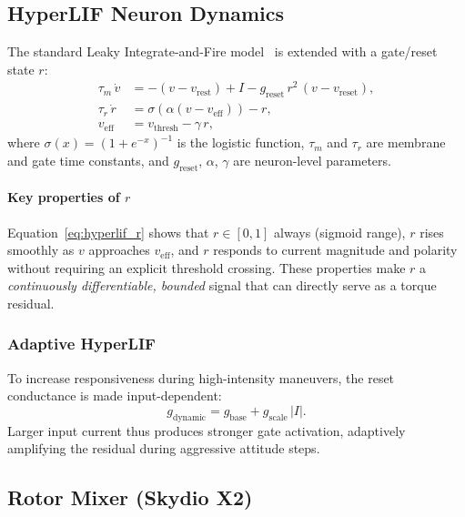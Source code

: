 \documentclass[conference]{IEEEtran}
\begin{document}
\subsection{HyperLIF Neuron Dynamics}
\label{sec:hyperlif_dynamics}

The standard Leaky Integrate-and-Fire model~\cite{maass1997lsm} is extended
with a gate/reset state $r$:
\begin{align}
  \tau_m\,\dot{v} &= -(v - v_{\mathrm{rest}}) + I
                     - g_{\mathrm{reset}}\,r^2\,(v - v_{\mathrm{reset}}),
  \label{eq:hyperlif_v}\\
  \tau_r\,\dot{r} &= \sigma\!\left(\alpha(v - v_{\mathrm{eff}})\right) - r,
  \label{eq:hyperlif_r}\\
  v_{\mathrm{eff}} &= v_{\mathrm{thresh}} - \gamma\,r,
  \label{eq:hyperlif_veff}
\end{align}
where $\sigma(x)=(1+e^{-x})^{-1}$ is the logistic function,
$\tau_m$ and $\tau_r$ are membrane and gate time constants,
and $g_{\mathrm{reset}}$, $\alpha$, $\gamma$ are neuron-level parameters.

\paragraph{Key properties of $r$}
Equation~\eqref{eq:hyperlif_r} shows that $r \in [0,1]$ always (sigmoid range),
$r$ rises smoothly as $v$ approaches $v_{\mathrm{eff}}$, and $r$ responds to
current magnitude and polarity without requiring an explicit threshold crossing.
These properties make $r$ a \emph{continuously differentiable, bounded} signal
that can directly serve as a torque residual.

\subsubsection{Adaptive HyperLIF}

To increase responsiveness during high-intensity maneuvers, the reset
conductance is made input-dependent:
\begin{equation}
  g_{\mathrm{dynamic}} = g_{\mathrm{base}} + g_{\mathrm{scale}}\,|I|.
  \label{eq:adaptive_g}
\end{equation}
Larger input current thus produces stronger gate activation, adaptively
amplifying the residual during aggressive attitude steps.

\subsection{Rotor Mixer (Skydio X2)}
\label{sec:rotor_mixer}
\end{document}
